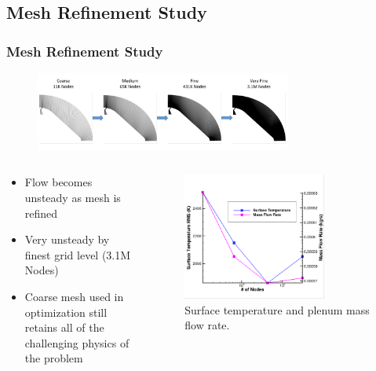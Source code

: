 \documentclass{beamer}
\begin{document}
\subsection{Mesh Refinement Study}
\begin{frame}
  \frametitle{Mesh Refinement Study}
\begin{figure}[h]
  \centering
  \includegraphics[width=0.75\textwidth]{figures/mesh-progression.png}
\end{figure}
\vspace{-1cm}
  \begin{columns}
    \begin{column}{0.5\textwidth}
      \begin{itemize}
        \item Flow becomes unsteady as mesh is refined
        \item Very unsteady by finest grid level (3.1M Nodes)
        \item Coarse mesh used in optimization still retains all of the
          challenging physics of the problem
      \end{itemize}
    \end{column}
    \begin{column}{0.5\textwidth}
\begin{figure}[!h]
  \centering
  \includegraphics[width=0.75\textwidth]{figures/t-m-conv.png}
  \caption{Surface temperature and plenum mass flow rate.}
  \label{fig:grid-convergence}
\end{figure}
    \end{column}
  \end{columns}
\end{frame}
\end{document}
